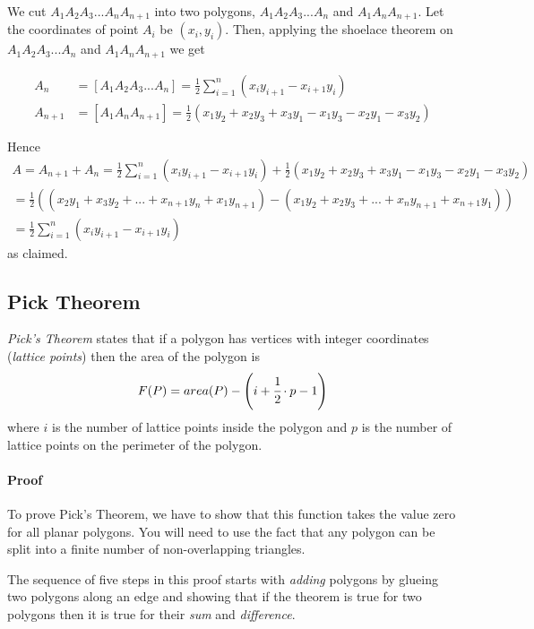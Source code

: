 \documentclass[]{scrartcl}
\begin{document}
We cut $A_1A_2A_3...A_nA_{n+1}$ into two polygons, $A_1A_2A_3...A_n$ and $A_1A_nA_{n+1}$. Let the coordinates of point $A_i$ be $(x_i, y_i)$. Then, applying the shoelace theorem on $A_1A_2A_3...A_n$ and $A_1A_nA_{n+1}$ we get

\begin{align}
A_{n} &= [A_1A_2A_3...A_n] =\frac{1}{2}\sum_{i=1}^{n}(x_iy_{i+1}-x_{i+1}y_i) \\
A_{n+1} &= [A_1A_nA_{n+1}] =\frac{1}{2}(x_1y_2+x_2y_3+x_3y_1-x_1y_3-x_2y_1-x_3y_2)
\end{align}

Hence
\begin{equation}
\begin{gathered}
 A = A_{n+1} + A_n =\frac{1}{2}\sum_{i=1}^{n}(x_iy_{i+1}-x_{i+1}y_i)+\frac{1}{2}(x_1y_2+x_2y_3+x_3y_1-x_1y_3-x_2y_1-x_3y_2)\\ =\frac{1}{2}((x_2y_1+x_3y_2+...+x_{n+1}y_n+x_1y_{n+1})-(x_1y_2+x_2y_3+...+x_ny_{n+1}+x_{n+1}y_1))\\
 =\boxed{\frac{1}{2}\sum_{i=1}^n(x_iy_{i+1}-x_{i+1}y_i)}
\end{gathered}
\end{equation}
as claimed.
\subsection{Pick Theorem}

\emph{Pick's Theorem} states that if a polygon has vertices with integer coordinates (\emph{lattice points}) then the area of the polygon is 
\begin{equation}
F(P) = area(P) - \left(i + \cfrac{1}{2}\cdot p - 1\right)
\end{equation}
where $i$ is the number of lattice points inside the polygon and $p$ is the number of lattice points on the perimeter of the polygon.

\paragraph{Proof} To prove Pick's Theorem, we have to show that this function takes the value zero for all planar polygons. You will need to use the fact that any polygon can be split into a finite number of non-overlapping triangles.

The sequence of five steps in this proof starts with \emph{adding} polygons by glueing two polygons along an edge and showing that if the theorem is true for two polygons then it is true for their \emph{sum} and \emph{difference}.
\end{document}
